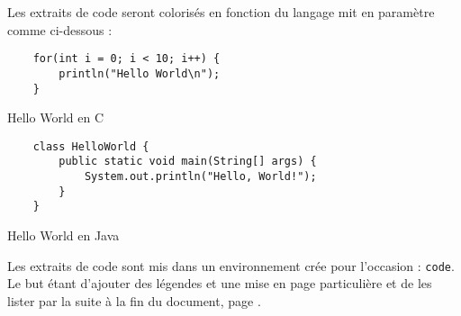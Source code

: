 Les extraits de code seront colorisés en fonction du langage mit en paramètre comme ci-dessous :

\begin{code}
    \begin{verbatim}
    for(int i = 0; i < 10; i++) {
        println("Hello World\n");
    }
\end{verbatim}
    \caption{Hello World en C}
\end{code}

\begin{code}
    \begin{verbatim}
    class HelloWorld {
        public static void main(String[] args) {
            System.out.println("Hello, World!");
        }
    }
\end{verbatim}
    \caption{Hello World en Java}
\end{code}

Les extraits de code sont mis dans un environnement crée pour l'occasion : \verb=code=.
Le but étant d'ajouter des légendes et une mise en page particulière et de les lister par la suite à la fin du document,
page \pageref{TableOfCode}.

